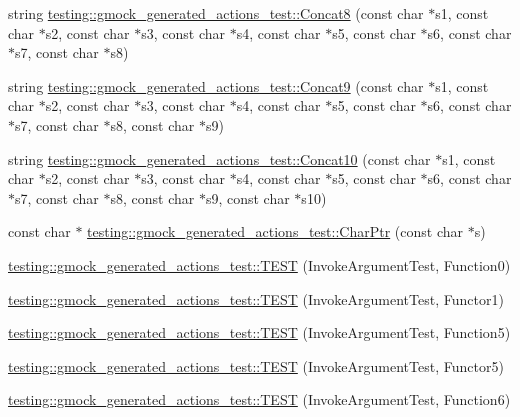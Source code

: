\begin{DoxyCompactItemize}
\item 
string \hyperlink{namespacetesting_1_1gmock__generated__actions__test_aa6540c5cd5e5cb3ca2253739c05323e8}{testing\+::gmock\+\_\+generated\+\_\+actions\+\_\+test\+::\+Concat8} (const char $\ast$s1, const char $\ast$s2, const char $\ast$s3, const char $\ast$s4, const char $\ast$s5, const char $\ast$s6, const char $\ast$s7, const char $\ast$s8)
\item 
string \hyperlink{namespacetesting_1_1gmock__generated__actions__test_a524a8b6e13732969d177254474c94e2b}{testing\+::gmock\+\_\+generated\+\_\+actions\+\_\+test\+::\+Concat9} (const char $\ast$s1, const char $\ast$s2, const char $\ast$s3, const char $\ast$s4, const char $\ast$s5, const char $\ast$s6, const char $\ast$s7, const char $\ast$s8, const char $\ast$s9)
\item 
string \hyperlink{namespacetesting_1_1gmock__generated__actions__test_ae90b9884fe6a44fa67c323c4f2f46d4f}{testing\+::gmock\+\_\+generated\+\_\+actions\+\_\+test\+::\+Concat10} (const char $\ast$s1, const char $\ast$s2, const char $\ast$s3, const char $\ast$s4, const char $\ast$s5, const char $\ast$s6, const char $\ast$s7, const char $\ast$s8, const char $\ast$s9, const char $\ast$s10)
\item 
const char $\ast$ \hyperlink{namespacetesting_1_1gmock__generated__actions__test_aa0f16da563ba1f4dd15c8a4fd9048fd3}{testing\+::gmock\+\_\+generated\+\_\+actions\+\_\+test\+::\+Char\+Ptr} (const char $\ast$s)
\item 
\hyperlink{namespacetesting_1_1gmock__generated__actions__test_aee4ab8d88ec59a7e3b91d919a6ed34da}{testing\+::gmock\+\_\+generated\+\_\+actions\+\_\+test\+::\+T\+E\+ST} (Invoke\+Argument\+Test, Function0)
\item 
\hyperlink{namespacetesting_1_1gmock__generated__actions__test_a47d12c8e504971d1f1c17df8d90bff82}{testing\+::gmock\+\_\+generated\+\_\+actions\+\_\+test\+::\+T\+E\+ST} (Invoke\+Argument\+Test, Functor1)
\item 
\hyperlink{namespacetesting_1_1gmock__generated__actions__test_a6afe3cf31ef3f5a9d6fd6af05c9de95c}{testing\+::gmock\+\_\+generated\+\_\+actions\+\_\+test\+::\+T\+E\+ST} (Invoke\+Argument\+Test, Function5)
\item 
\hyperlink{namespacetesting_1_1gmock__generated__actions__test_aab59917791fb297d6735d46e9a862be1}{testing\+::gmock\+\_\+generated\+\_\+actions\+\_\+test\+::\+T\+E\+ST} (Invoke\+Argument\+Test, Functor5)
\item 
\hyperlink{namespacetesting_1_1gmock__generated__actions__test_ae3f8bdac5c2ea1cf56ff1484ebb9a44e}{testing\+::gmock\+\_\+generated\+\_\+actions\+\_\+test\+::\+T\+E\+ST} (Invoke\+Argument\+Test, Function6)

\end{DoxyCompactItemize}
